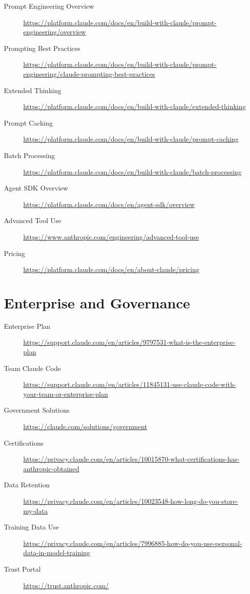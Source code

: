 \begin{description}
  \item[Prompt Engineering Overview] \url{https://platform.claude.com/docs/en/build-with-claude/prompt-engineering/overview}
  \item[Prompting Best Practices] \url{https://platform.claude.com/docs/en/build-with-claude/prompt-engineering/claude-prompting-best-practices}
  \item[Extended Thinking] \url{https://platform.claude.com/docs/en/build-with-claude/extended-thinking}
  \item[Prompt Caching] \url{https://platform.claude.com/docs/en/build-with-claude/prompt-caching}
  \item[Batch Processing] \url{https://platform.claude.com/docs/en/build-with-claude/batch-processing}
  \item[Agent SDK Overview] \url{https://platform.claude.com/docs/en/agent-sdk/overview}
  \item[Advanced Tool Use] \url{https://www.anthropic.com/engineering/advanced-tool-use}
  \item[Pricing] \url{https://platform.claude.com/docs/en/about-claude/pricing}
\end{description}

\section{Enterprise and Governance}

\begin{description}
  \item[Enterprise Plan] \url{https://support.claude.com/en/articles/9797531-what-is-the-enterprise-plan}
  \item[Team Claude Code] \url{https://support.claude.com/en/articles/11845131-use-claude-code-with-your-team-or-enterprise-plan}
  \item[Government Solutions] \url{https://claude.com/solutions/government}
  \item[Certifications] \url{https://privacy.claude.com/en/articles/10015870-what-certifications-has-anthropic-obtained}
  \item[Data Retention] \url{https://privacy.claude.com/en/articles/10023548-how-long-do-you-store-my-data}
  \item[Training Data Use] \url{https://privacy.claude.com/en/articles/7996885-how-do-you-use-personal-data-in-model-training}
  \item[Trust Portal] \url{https://trust.anthropic.com/}
\end{description}

